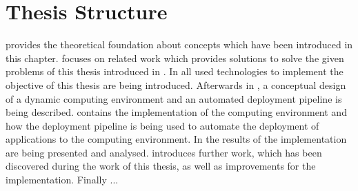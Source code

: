 \section{Thesis Structure}
 provides the theoretical foundation about concepts which have been introduced in this chapter.
 focuses on related work which provides solutions to solve the given problems of this thesis introduced in .
In  all used technologies to implement the objective of this thesis are being introduced.
Afterwards in , a conceptual design of a dynamic computing environment and an automated deployment pipeline is being described.
 contains the implementation of the computing environment and how the deployment pipeline is being used to automate the deployment of applications to the computing environment.
In  the results of the implementation are being presented and analysed.
 introduces further work, which has been discovered during the work of this thesis, as well as improvements for the implementation.
Finally  ...
